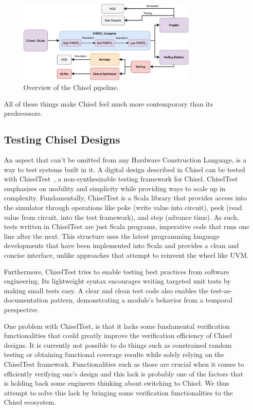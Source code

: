 \documentclass[conference]{IEEEtran}
\begin{document}
\begin{figure}
    \includegraphics[width=9cm]{Chisel_FIRRTL_VERILOG.pdf}
    \caption{Overview of the Chisel pipeline.}
\label{fig:chisel-pipe}
\end{figure}

All of these things make Chisel feel much more contemporary than its predecessors.

\subsection{Testing Chisel Designs}
An aspect that can't be omitted from any Hardware Construction Language, is a way to test systems built in it.
A digital design described in Chisel can be tested with ChiselTest~\cite{chisel:tester2}, a non-synthesizable testing framework for Chisel.
ChiselTest emphasizes on usability and simplicity while providing ways to scale up in complexity.
Fundamentally, ChiselTest is a Scala library that provides access into the simulator through
operations like poke (write value into circuit), peek (read value from circuit, into the test framework), and step (advance time).
As such, tests written in ChiselTest are just Scala programs, imperative code that runs one line after the next.
This structure uses the latest programming language developments that have been implemented into Scala
and provides a clean and concise interface, unlike approaches that attempt to reinvent the wheel like UVM.

Furthermore, ChiselTest tries to enable testing best practices from software engineering.
Its lightweight syntax encourages writing targeted unit tests by making small tests easy.
A clear and clean test code also enables the test-as-documentation pattern,
demonstrating a module's behavior from a temporal perspective.

One problem with ChiselTest, is that it lacks some fundamental verification functionalities that could greatly improve the verification efficiency of Chisel designs. 
It is currently not possible to do things such as constrained random testing or obtaining functional coverage results while solely relying on the ChiselTest framework. 
Functionalities such as those are crucial when it comes to efficiently verifying one's design and this lack is probably one of the factors that is holding back some engineers thinking about switching to Chisel. 
We thus attempt to solve this lack by bringing some verification functionalities to the Chisel ecosystem. 
\end{document}
